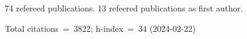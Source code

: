 74 refereed publications. 13 refeered publications as first author.

Total citations~=~3822; h-index~=~34 (2024-02-22)